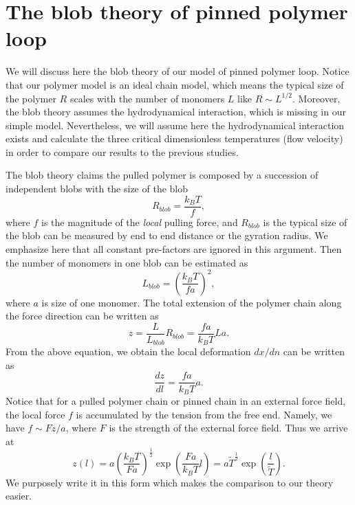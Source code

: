 
\chapter{The blob theory of pinned polymer loop}
\label{append:blob_theory}

We will discuss here the blob theory of our model of pinned polymer loop. Notice that our polymer model is an ideal chain model, which means the typical size of the polymer $R$ scales with the number of monomers $L$ like $R\sim L^{1/2}$. Moreover, the blob theory assumes the hydrodynamical interaction, which is missing in our simple model. Nevertheless, we will assume here the hydrodynamical interaction exists and calculate the three critical dimensionless temperatures (flow velocity) in order to compare our results to the previous studies.

The blob theory claims the pulled polymer is composed by a succession of independent blobs with the size of the blob
\begin{equation}
    \label{eq:blobSize}
    R_{blob} = \frac{k_B T}{f}, 
\end{equation}
where $f$ is the magnitude of the \emph{local} pulling force, and $R_{blob}$ is the typical size of the blob can be measured by end to end distance or the gyration radius. We emphasize here that all constant pre-factors are ignored in this argument. Then the number of monomers in one blob can be estimated as
\begin{equation}
    \label{eq:monomersInBlob}
    L_{blob} = \left(\frac{k_B T}{f a}\right)^2,
\end{equation}
where $a$ is size of one monomer. The total extension of the polymer chain along the force direction can be written as
\begin{equation}
    \label{eq:totalExtension}
    z = \frac{L}{L_{blob}} R_{blob} = \frac{fa}{k_B T} La.
\end{equation}
From the above equation, we obtain the local deformation $dx/dn$ can be written as
\begin{equation}
    \label{eq:localDeformation}
    \frac{dz}{dl} = \frac{fa}{k_B T} a.
\end{equation}
Notice that for a pulled polymer chain or pinned chain in an external force field, the local force $f$ is accumulated by the tension from the free end. Namely, we have $f \sim F z / a $, where $F$ is the strength of the external force field. Thus we arrive at
\begin{equation}
    \label{eq:extensionLength}
    z(l) = a \left(\frac{k_B T}{Fa}\right)^{\frac{1}{2}}\exp\left(\frac{Fa}{k_B T} l\right) = a \tilde{T}^{\frac{1}{2}} \exp\left(\frac{l}{\tilde{T}}\right).
\end{equation}
We purposely write it in this form which makes the comparison to our theory easier. 

